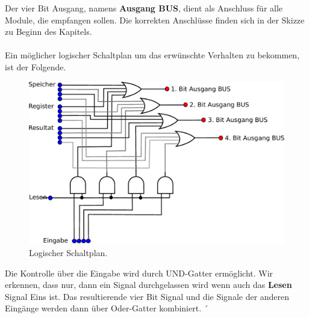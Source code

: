 \documentclass[11pt,a4paper,leqno]{report}
\numberwithin{equation}{chapter}
\begin{document}
Der vier Bit Ausgang, namens \textbf{Ausgang BUS}, dient als Anschluss f\"ur alle Module, die empfangen sollen. Die korrekten Anschl\"usse finden sich in der Skizze zu Beginn des Kapitels.\\
\\
Ein m\"oglicher logischer Schaltplan um das erw\"unschte Verhalten zu bekommen, ist der Folgende.
\begin{figure}[H]
	\begin{center}
		\includegraphics[scale=0.8]{Bilder/BUS.pdf}
		\caption{Logischer Schaltplan.}
	\end{center}
\end{figure}
\noindent
Die Kontrolle \"uber die Eingabe wird durch UND-Gatter erm\"oglicht. Wir erkennen, dass nur, dann ein Signal durchgelassen wird wenn auch das \textbf{Lesen} Signal Eins ist. Das resultierende vier Bit Signal und die Signale der anderen Eing\"ange werden dann \"uber Oder-Gatter kombiniert. 
\newpage´
\end{document}
